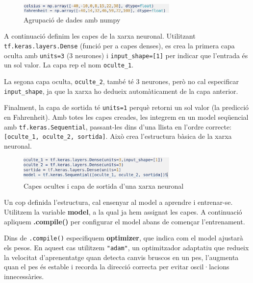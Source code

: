 \begin{figure}[H]

\centering

\includegraphics[width=0.7\textwidth]{./figures/2.png}

\caption{Agrupació de dades amb numpy}

\end{figure}

A continuació definim les capes de la xarxa neuronal. Utilitzant \texttt{tf.keras.layers.Dense} (funció per a capes denses), es crea la primera capa oculta amb \texttt{units=3} (3 neurones) i \texttt{input\_shape=[1]} per indicar que l’entrada és un sol valor. La capa rep el nom \texttt{oculte\_1}.

La segona capa oculta, \texttt{oculte\_2}, també té 3 neurones, però no cal especificar \texttt{input\_shape}, ja que la xarxa ho dedueix automàticament de la capa anterior.

Finalment, la capa de sortida té \texttt{units=1} perquè retorni un sol valor (la predicció en Fahrenheit). Amb totes les capes creades, les integrem en un model seqüencial amb \texttt{tf.keras.Sequential}, passant-les dins d’una llista en l’ordre correcte: \texttt{[oculte\_1, oculte\_2, sortida]}. Això crea l’estructura bàsica de la xarxa neuronal.

\begin{figure}[H]

\centering

\includegraphics[width=0.7\textwidth]{./figures/3.png}

\caption{Capes ocultes i capa de sortida d’una xarxa neuronal}

\end{figure}

Un cop definida l’estructura, cal ensenyar al model a aprendre i entrenar-se. Utilitzem la variable \textbf{model}, a la qual ja hem assignat les capes. A continuació apliquem \textbf{.compile()} per configurar el model abans de començar l’entrenament.

Dins de \texttt{.compile()} especifiquem \textbf{optimizer}, que indica com el model ajustarà els pesos. En aquest cas utilitzem \texttt{"adam"}, un optimitzador adaptatiu que redueix la velocitat d’aprenentatge quan detecta canvis bruscos en un pes, l’augmenta quan el pes és estable i recorda la direcció correcta per evitar oscil·lacions innecessàries.

